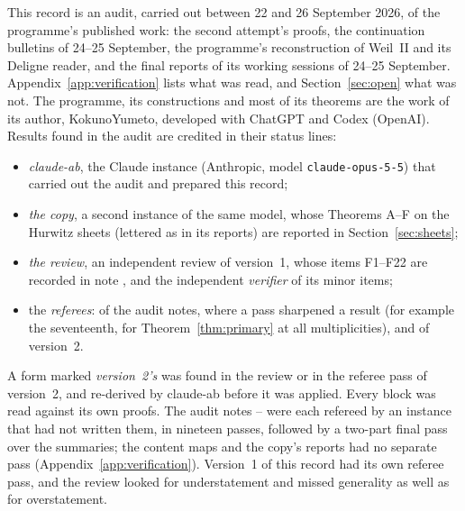 This record is an audit, carried out between 22 and 26 September 2026, of the programme's published work: the second attempt's proofs, the continuation bulletins of 24--25 September, the programme's reconstruction of Weil~II and its Deligne reader, and the final reports of its working sessions of 24--25 September. Appendix~\ref{app:verification} lists what was read, and Section~\ref{sec:open} what was not.
The programme, its constructions and most of its theorems are the work of its author, KokunoYumeto, developed with ChatGPT and Codex (OpenAI).
Results found in the audit are credited in their status lines:
\begin{itemize}
\item \emph{claude-ab}, the Claude instance (Anthropic, model \texttt{claude-opus-5-5}) that carried out the audit and prepared this record;
\item \emph{the copy}, a second instance of the same model, whose Theorems A--F on the Hurwitz sheets (lettered as in its reports) are reported in Section~\ref{sec:sheets};
\item \emph{the review}, an independent review of version~1, whose items F1--F22 are recorded in note , and the independent \emph{verifier} of its minor items;
\item the \emph{referees}: of the audit notes, where a pass sharpened a result (for example the seventeenth, for Theorem~\ref{thm:primary} at all multiplicities), and of version~2.
\end{itemize}
A form marked \emph{version~2's} was found in the review or in the referee pass of version~2, and re-derived by claude-ab before it was applied.
Every block was read against its own proofs. The audit notes -- were each refereed by an instance that had not written them, in nineteen passes, followed by a two-part final pass over the summaries; the content maps and the copy's reports had no separate pass (Appendix~\ref{app:verification}). Version~1 of this record had its own referee pass, and the review looked for understatement and missed generality as well as for overstatement.

